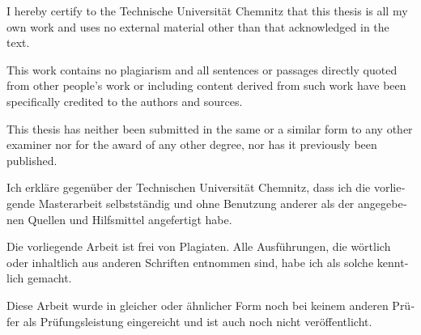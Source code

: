 %
%

\begin{tucerklaerung}
I hereby certify to the Technische Universität Chemnitz that this thesis is all my own work and uses no external material
other than that acknowledged in the text.

This work contains no plagiarism and all sentences or passages directly
quoted from other people's work or including content derived from such work
have been specifically credited to the authors and sources.

This thesis has neither been submitted in the same or a similar form to any
other examiner nor for the award of any other degree, nor has it previously
been published.

\end{tucerklaerung}


%
%

\begin{otherlanguage}{ngerman}
\begin{tucerklaerung}
Ich erkläre gegenüber der Technischen Universität Chemnitz, dass ich die
vorliegende Masterarbeit selbstständig und ohne Benutzung anderer
als der angegebenen Quellen und Hilfsmittel angefertigt habe.

Die vorliegende Arbeit ist frei von Plagiaten. Alle Ausführungen, die wörtlich
oder inhaltlich aus anderen Schriften entnommen sind, habe ich als solche
kenntlich gemacht.

Diese Arbeit wurde in gleicher oder ähnlicher Form noch bei keinem anderen
Prüfer als Prüfungsleistung eingereicht und ist auch noch nicht veröffentlicht.

\end{tucerklaerung}
\end{otherlanguage}
